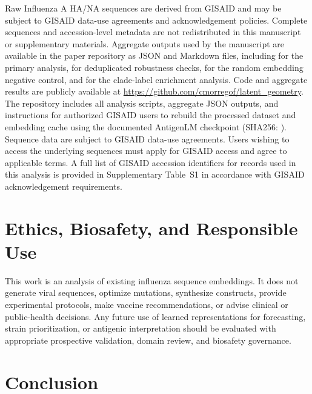 \documentclass[11pt]{article}
\begin{document}
Raw Influenza A HA/NA sequences are derived from GISAID \cite{shu2017gisaid} and may be subject to GISAID data-use agreements and acknowledgement policies. Complete sequences and accession-level metadata are not redistributed in this manuscript or supplementary materials. Aggregate outputs used by the manuscript are available in the paper repository as JSON and Markdown files, including  for the primary analysis,  for deduplicated robustness checks,  for the random embedding negative control, and  for the clade-label enrichment analysis. Code and aggregate results are publicly available at \url{https://github.com/cmorregof/latent_geometry}. The repository includes all analysis scripts, aggregate JSON outputs, and instructions for authorized GISAID users to rebuild the processed dataset and embedding cache using the documented AntigenLM checkpoint (SHA256: ). Sequence data are subject to GISAID data-use agreements. Users wishing to access the underlying sequences must apply for GISAID access and agree to applicable terms. A full list of GISAID accession identifiers for records used in this analysis is provided in Supplementary Table~S1 in accordance with GISAID acknowledgement requirements.

\section{Ethics, Biosafety, and Responsible Use}

This work is an analysis of existing influenza sequence embeddings. It does not generate viral sequences, optimize mutations, synthesize constructs, provide experimental protocols, make vaccine recommendations, or advise clinical or public-health decisions. Any future use of learned representations for forecasting, strain prioritization, or antigenic interpretation should be evaluated with appropriate prospective validation, domain review, and biosafety governance.

\section{Conclusion}
\end{document}
